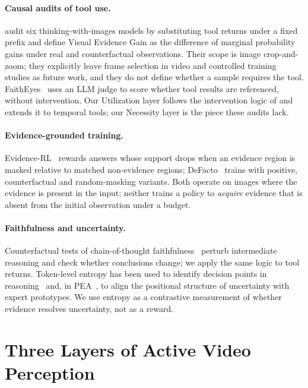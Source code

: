 \documentclass{article}
\begin{document}
\paragraph{Causal audits of tool use.} \citet{illusion2026} audit six thinking-with-images models by substituting tool returns under a fixed prefix and define Visual Evidence Gain as the difference of marginal probability gains under real and counterfactual observations. Their scope is image crop-and-zoom; they explicitly leave frame selection in video and controlled training studies as future work, and they do not define whether a sample requires the tool. FaithEyes~\citep{faitheyes2026} uses an LLM judge to score whether tool results are referenced, without intervention. Our Utilization layer follows the intervention logic of \citet{illusion2026} and extends it to temporal tools; our Necessity layer is the piece these audits lack.

\paragraph{Evidence-grounded training.} Evidence-RL~\citep{evidencerl2026} rewards answers whose support drops when an evidence region is masked relative to matched non-evidence regions; DeFacto~\citep{defacto2025} trains with positive, counterfactual and random-masking variants. Both operate on images where the evidence is present in the input; neither trains a policy to \emph{acquire} evidence that is absent from the initial observation under a budget.

\paragraph{Faithfulness and uncertainty.} Counterfactual tests of chain-of-thought faithfulness~\citep{turpin2023,lanham2023} perturb intermediate reasoning and check whether conclusions change; we apply the same logic to tool returns. Token-level entropy has been used to identify decision points in reasoning~\citep{wang2025entropy} and, in PEA~\citep{pea2026}, to align the positional structure of uncertainty with expert prototypes. We use entropy as a contrastive measurement of whether evidence resolves uncertainty, not as a reward.

\section{Three Layers of Active Video Perception}
\label{sec:framework}
\end{document}
